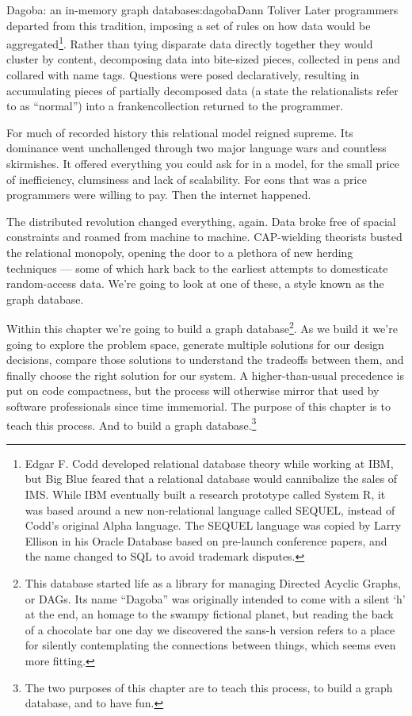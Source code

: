 \begin{aosachapter}{Dagoba: an in-memory graph database}{s:dagoba}{Dann Toliver}
Later programmers departed from this tradition, imposing a set of rules
on how data would be aggregated\footnote{Edgar F. Codd developed
  relational database theory while working at IBM, but Big Blue feared
  that a relational database would cannibalize the sales of IMS. While
  IBM eventually built a research prototype called System R, it was
  based around a new non-relational language called SEQUEL, instead of
  Codd's original Alpha language. The SEQUEL language was copied by
  Larry Ellison in his Oracle Database based on pre-launch conference
  papers, and the name changed to SQL to avoid trademark disputes.}.
Rather than tying disparate data directly together they would cluster by
content, decomposing data into bite-sized pieces, collected in pens and
collared with name tags. Questions were posed declaratively, resulting
in accumulating pieces of partially decomposed data (a state the
relationalists refer to as ``normal'') into a frankencollection returned
to the programmer.

For much of recorded history this relational model reigned supreme. Its
dominance went unchallenged through two major language wars and
countless skirmishes. It offered everything you could ask for in a
model, for the small price of inefficiency, clumsiness and lack of
scalability. For eons that was a price programmers were willing to pay.
Then the internet happened.

The distributed revolution changed everything, again. Data broke free of
spacial constraints and roamed from machine to machine. CAP-wielding
theorists busted the relational monopoly, opening the door to a plethora
of new herding techniques --- some of which hark back to the earliest
attempts to domesticate random-access data. We're going to look at one
of these, a style known as the graph database.

\label{take-one}

Within this chapter we're going to build a graph database\footnote{This
  database started life as a library for managing Directed Acyclic
  Graphs, or DAGs. Its name ``Dagoba'' was originally intended to come
  with a silent `h' at the end, an homage to the swampy fictional
  planet, but reading the back of a chocolate bar one day we discovered
  the sans-h version refers to a place for silently contemplating the
  connections between things, which seems even more fitting.}. As we
build it we're going to explore the problem space, generate multiple
solutions for our design decisions, compare those solutions to
understand the tradeoffs between them, and finally choose the right
solution for our system. A higher-than-usual precedence is put on code
compactness, but the process will otherwise mirror that used by software
professionals since time immemorial. The purpose of this chapter is to
teach this process. And to build a graph database.\footnote{The two
  purposes of this chapter are to teach this process, to build a graph
  database, and to have fun.}


\end{aosachapter}
